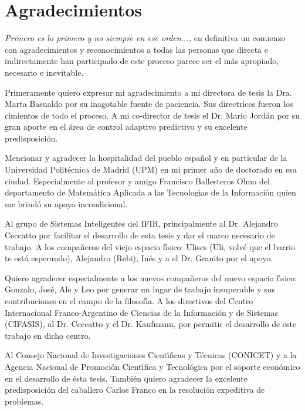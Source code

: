\chapter*{Agradecimientos}
\emph{Primero es lo primero y no siempre en ese orden...,} en definitiva un comienzo con agradecimientos y
reconocimientos a todas las personas que directa e indirectamente han participado de este proceso parece ser
el m{\'a}s apropiado, necesario e inevitable.

Primeramente quiero expresar mi agradecimiento a mi directora de tesis la Dra. Marta Basualdo por su
inagotable fuente de paciencia. Sus directrices fueron los cimientos de todo el proceso. A mi co-director de
tesis el Dr. Mario Jord{\'a}n por su gran aporte en el {\'a}rea de control adaptivo predictivo y su excelente
predisposici{\'o}n.

Mencionar y agradecer la hospitalidad del pueblo espa{\~n}ol y en particular de la Universidad Polit{\'e}cnica de
Madrid (UPM) en mi primer a{\~n}o de doctorado en esa ciudad. Especialmente al profesor y amigo Francisco
Ballesteros Olmo del departamento de Matem{\'a}tica Aplicada a las Tecnolog{\'\i}as de la Informaci{\'o}n quien me brind{\'o}
su apoyo incondicional.

Al grupo de Sistemas Inteligentes del IFIR, principalmente al Dr. Alejandro Ceccatto por facilitar el desarrollo de esta tesis y dar el marco
necesario de trabajo.  A los compa{\~n}eros del viejo espacio f{\'\i}sico: Ulises (Uli, volv{\'e} que el barrio te est{\'a} esperando), Alejandro (Rebi), In{\'e}s y a el
Dr. Granito por el apoyo.

Quiero agradecer especialmente a los nuevos compa{\~n}eros del nuevo espacio f{\'\i}sico: Gonzalo, Jos{\'e}, Ale y Leo
por generar un lugar de trabajo insuperable y sus contribuciones en el campo de la filosof{\'\i}a. A los
directivos del Centro Internacional Franco-Argentino de Ciencias de la Informaci{\'o}n y de Sistemas (CIFASIS),
al Dr. Ceccatto y el Dr. Kaufmann, por permitir el desarrollo de este trabajo en dicho centro.

Al Consejo Nacional de Investigaciones Cient{\'\i}ficas y T{\'e}cnicas (CONICET) y a la Agencia Nacional de Promoci{\'o}n
Cient{\'\i}fica y Tecnol{\'o}gica por el soporte econ{\'o}mico en el desarrollo de {\'e}sta tesis. Tambi{\'e}n quiero agradecer
la excelente predisposici{\'o}n del caballero Carlos Franco en la resoluci{\'o}n expeditiva de problemas.

